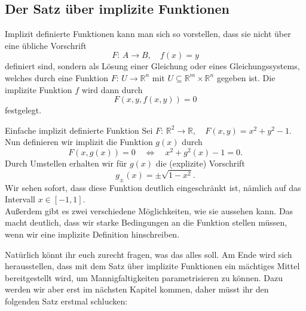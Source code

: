 \subsection{Der Satz über implizite Funktionen}
Implizit definierte Funktionen kann man sich so vorstellen, dass sie nicht über eine übliche Vorschrift
\begin{equation*}
    F:\,A\rightarrow B, \quad f(x)=y
\end{equation*}
definiert sind, sondern als Lösung einer Gleichung oder eines Gleichungssystems, welches durch eine Funktion $F:\,U\rightarrow\mathbb{R}^n$ mit $U\subseteq\mathbb{R}^m\times\mathbb{R}^n$ gegeben ist. Die implizite Funktion $f$ wird dann durch
\begin{equation*}
    F(x,y,f(x,y)) = 0
\end{equation*}
festgelegt.
\begin{Beispiel}
{Einfache implizit definierte Funktion}
Sei $F:\,\mathbb{R}^2\rightarrow\mathbb{R}, \quad F(x,y)=x^2+y^2-1$. Nun definieren wir implizit die Funktion $g(x)$ durch
\begin{equation*}
    F(x,g(x))=0 \quad \Leftrightarrow\quad x^2+g^2(x)-1=0.
\end{equation*}
Durch Umstellen erhalten wir für $g(x)$ die (explizite) Vorschrift
\begin{equation*}
    g_\pm(x)=\pm\sqrt{1-x^2}.
\end{equation*}
Wir sehen sofort, dass diese Funktion deutlich eingeschränkt ist, nämlich auf das Intervall $x\in[-1,1]$.\\
Außerdem gibt es zwei verschiedene Möglichkeiten, wie sie aussehen kann. Das macht deutlich, dass wir starke Bedingungen an die Funktion stellen müssen, wenn wir eine implizite Definition hinschreiben.
\end{Beispiel}
Natürlich könnt ihr euch zurecht fragen, was das alles soll. Am Ende wird sich herausstellen, dass mit dem Satz über implizite Funktionen ein mächtiges Mittel bereitgestellt wird, um Mannigfaltigkeiten parametrisieren zu können. Dazu werden wir aber erst im nächsten Kapitel kommen, daher müsst ihr den folgenden Satz erstmal schlucken: 

